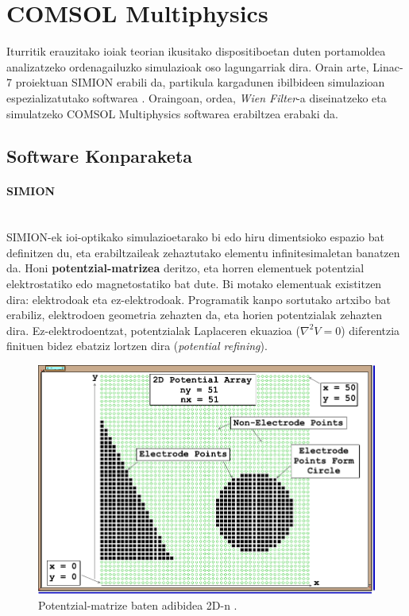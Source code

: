 \documentclass[12pt]{article}
\numberwithin{figure}{section}
\numberwithin{equation}{section}
\begin{document}
\section{COMSOL Multiphysics}
Iturritik erauzitako ioiak teorian ikusitako dispositiboetan duten portamoldea analizatzeko ordenagailuzko simulazioak oso lagungarriak dira. Orain arte, Linac-7 proiektuan SIMION erabili da, partikula kargadunen ibilbideen simulazioan espezializatutako softwarea \cite{noauthor_simion_2020}. Oraingoan, ordea, \textit{Wien Filter}-a diseinatzeko eta simulatzeko COMSOL Multiphysics \cite{noauthor_comsol_2025} softwarea erabiltzea erabaki da.
\subsection{Software Konparaketa}
\paragraph{SIMION}\leavevmode\\

SIMION-ek ioi-optikako simulazioetarako bi edo hiru dimentsioko espazio bat definitzen du, eta erabiltzaileak zehaztutako elementu infinitesimaletan banatzen da. Honi \textbf{potentzial-matrizea} deritzo, eta horren elementuek potentzial elektrostatiko edo magnetostatiko bat dute. Bi motako elementuak existitzen dira: elektrodoak eta ez-elektrodoak. Programatik kanpo sortutako artxibo bat erabiliz, elektrodoen geometria zehazten da, eta horien potentzialak zehazten dira. Ez\hyp{}elektrodoentzat, potentzialak Laplaceren ekuazioa ($\nabla^2V=0$) diferentzia finituen bidez ebatziz lortzen dira (\textit{potential refining}).

\begin{figure}[h]
    \centering
    \includegraphics[width=0.6\linewidth]{3 - COMSOL/potential_array.png}
    \caption{Potentzial-matrize baten adibidea 2D-n \cite{manura_simion_2008}.}
    \label{fig:potential_array}
\end{figure}
\end{document}
